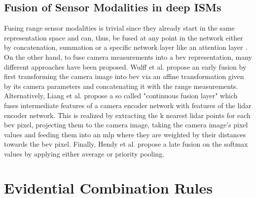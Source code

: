 \subsection{Fusion of Sensor Modalities in deep ISMs}
\label{subsec:deep_ism_fusion}
Fusing range sensor modalities is trivial since they already start in the same representation space and can, thus, be fused at any point in the network either by concatenation, summation or a specific network layer like an attention layer \cite{vaswani2017attention}. On the other hand, to fuse camera measurements into a \gls{bev} representation, many different approaches have been proposed. Wulff et al. \cite{wulff2018early} propose an early fusion by first transforming the camera image into \gls{bev} via an affine transformation given by its camera parameters and concatenating it with the range measurements. Alternatively, Liang et al. \cite{liang2018deep} propose a so called "continuous fusion layer" which fuses intermediate features of a camera encoder network with features of the lidar encoder network. This is realized by extracting the k nearest lidar points for each \gls{bev} pixel, projecting them to the camera image, taking the camera image's pixel values and feeding them into an \gls{mlp} where they are weighted by their distances towards the \gls{bev} pixel. Finally, Hendy et al. \cite{hendy2020fishing} propose a late fusion on the softmax values by applying either average or priority pooling.    
%
\section{Evidential Combination Rules}
\label{sec:evidence_theory}
%
